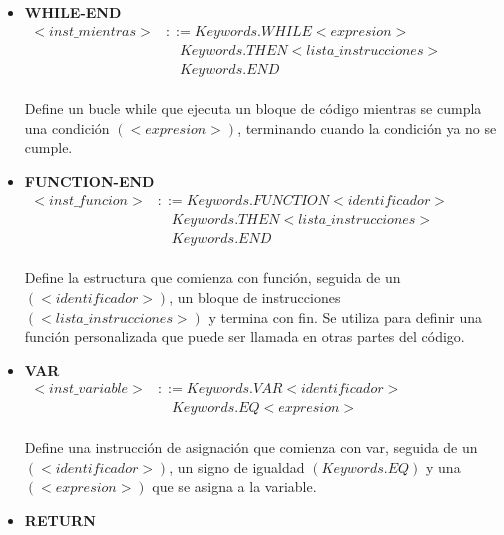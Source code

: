 \begin{itemize}
  \item \textbf{WHILE-END} \\
  \begin{math}
    \begin{array}{rl}
      <inst\_mientras> & ::= Keywords.WHILE <expresion> \\
        & \quad Keywords.THEN <lista\_instrucciones> \\
        & \quad Keywords.END
    \end{array}
  \end{math} \\\\
  Define un bucle while que ejecuta un bloque de código mientras se cumpla una condición $(<expresion>)$, terminando cuando la condición ya no se cumple.
  \item \textbf{FUNCTION-END} \\
  \begin{math}
    \begin{array}{rl}
      <inst\_funcion> & ::= Keywords.FUNCTION <identificador> \\
        & \quad Keywords.THEN <lista\_instrucciones> \\
        & \quad Keywords.END
    \end{array}
  \end{math} \\\\
  Define la estructura que comienza con función, seguida de un $(<identificador>)$, un bloque de instrucciones $(<lista\_instrucciones>)$ y termina con fin. Se utiliza para definir una función personalizada que puede ser llamada en otras partes del código.
  \item \textbf{VAR} \\
  \begin{math}
    \begin{array}{rl}
      <inst\_variable> & ::= Keywords.VAR <identificador> \\
      & \quad Keywords.EQ <expresion>
    \end{array}
  \end{math} \\\\
  Define una instrucción de asignación que comienza con var, seguida de un $(<identificador>)$, un signo de igualdad $(Keywords.EQ)$ y una $(<expresion>)$ que se asigna a la variable.
  \item \textbf{RETURN} \\
  \begin{math}

\end{math}
\end{itemize}
